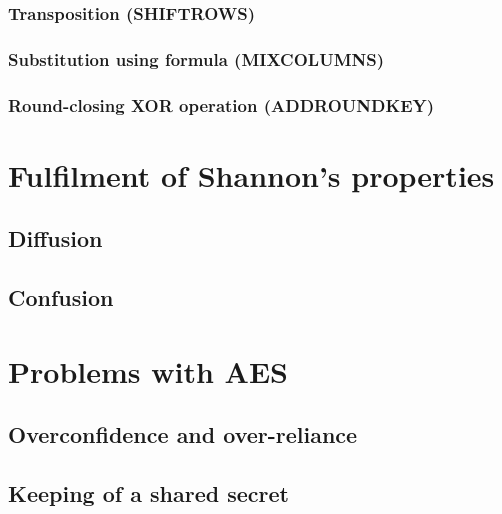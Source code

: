 \documentclass[12pt]{report}
\begin{document}
\subsubsection{Transposition (SHIFTROWS)}

\subsubsection{Substitution using formula (MIXCOLUMNS)}

\subsubsection{Round-closing XOR operation (ADDROUNDKEY)}

\section{Fulfilment of Shannon's properties}

\subsection{Diffusion}

\subsection{Confusion}

\section{Problems with AES}

\subsection{Overconfidence and over-reliance}

\subsection{Keeping of a shared secret}

\end{document}
